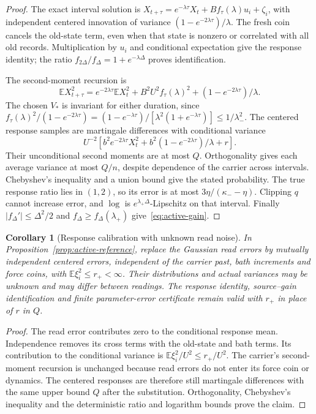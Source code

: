 \documentclass[12pt,a4paper]{article}
\newtheorem{corollary}[theorem]{Corollary}
\newcommand{\E}{\mathbb E}
\begin{document}
\begin{proof}
The exact interval solution is
$X_{t+\tau}=e^{-\lambda\tau}X_t+Bf_\tau(\lambda)u_i+\zeta_i$,
with independent centered innovation of variance
$(1-e^{-2\lambda\tau})/\lambda$.
The fresh coin cancels the old-state term, even when that state is
nonzero or correlated with all old records. Multiplication by $u_i$
and conditional expectation give the response identity; the ratio
$f_{2\Delta}/f_\Delta=1+e^{-\lambda\Delta}$ proves identification.

The second-moment recursion is
\[
 \E X_{t+\tau}^2=e^{-2\lambda\tau}\E X_t^2+
 B^2U^2f_\tau(\lambda)^2+
 (1-e^{-2\lambda\tau})/\lambda .
\]
The chosen $V_*$ is invariant for either duration, since
$f_\tau(\lambda)^2/(1-e^{-2\lambda\tau})
=(1-e^{-\lambda\tau})/[\lambda^2(1+e^{-\lambda\tau})]
\le1/\lambda_-^2$.
The centered response samples are martingale differences with
conditional variance
\[
 U^{-2}\left[b^2e^{-2\lambda\tau}X_t^2+
 b^2(1-e^{-2\lambda\tau})/\lambda+r\right].
\]
Their unconditional second moments are at most $Q$. Orthogonality
gives each average variance at most $Q/n$, despite dependence of the
carrier across intervals. Chebyshev's inequality and a union bound
give the stated probability.
The true response ratio lies in $(1,2)$, so its error is at most
$3\eta/(\kappa_--\eta)$. Clipping $q$ cannot increase error, and
$\log$ is $e^{\lambda_+\Delta}$-Lipschitz on that interval.
Finally $|f_\Delta'|\le\Delta^2/2$ and
$f_\Delta\ge f_\Delta(\lambda_+)$ give~\eqref{eq:active-gain}.
\end{proof}

\begin{corollary}[Response calibration with unknown read noise]
\label{cor:active-noise}
In Proposition~\ref{prop:active-reference}, replace the Gaussian
read errors by mutually independent centered errors, independent of
the carrier past, bath increments and force coins, with
$\E\xi_i^2\le r_+<\infty$. Their distributions and actual variances
may be unknown and may differ between readings. The response identity,
source--gain identification and finite parameter-error certificate
remain valid with $r_+$ in place of $r$ in $Q$.
\end{corollary}
\begin{proof}
The read error contributes zero to the conditional response mean.
Independence removes its cross terms with the old-state and bath
terms. Its contribution to the conditional variance is
$\E\xi_i^2/U^2\le r_+/U^2$.
The carrier's second-moment recursion is unchanged because read errors
do not enter its force coin or dynamics. The centered responses are
therefore still martingale differences with the same upper bound $Q$
after the substitution. Orthogonality, Chebyshev's inequality and the
deterministic ratio and logarithm bounds prove the claim.
\end{proof}
\end{document}
